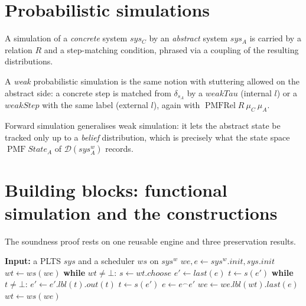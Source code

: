 





\section{Probabilistic simulations}

A simulation of a \emph{concrete} system $sys_C$ by an \emph{abstract} system
$sys_A$ is carried by a relation $R$ and a step-matching condition, phrased via a
coupling of the resulting distributions.





A \emph{weak} probabilistic simulation is the same notion with stuttering
allowed on the abstract side: a concrete step is matched from $\delta_{s_A}$ by
a $weakTau$ (internal $l$) or a $weakStep$ with the same label (external $l$),
again with $\operatorname{PMFRel} R\ \mu_C\ \mu_A$.



Forward simulation generalises weak simulation: it lets the abstract state be
tracked only up to a \emph{belief} distribution, which is precisely what the state
space $\operatorname{PMF} State_A$ of $\mathcal{D}(sys_A^w)$ records.

\section{Building blocks: functional simulation and the constructions}

The soundness proof rests on one reusable engine and three preservation results.







\begin{algorithm}
    \caption{Simulating a scheduler on $sys^w$}
    \label{alg:expand}
    \begin{algorithmic}
        \State \textbf{Input:} a PLTS $sys$ and a scheduler $ws$ on $sys^w$
        \medskip
        \State $we, e \gets sys^w.init, sys.init$
        \State $wt \gets ws(we)$
        \State \textbf{while} $wt \ne \bot$:
        \State\quad $s \gets wt.choose$ 
        \State\quad $e' \gets last(e)$
        \State\quad $t \gets s(e')$
        \State\quad \textbf{while} $t \ne \bot$:
        \State\quad\quad $e' \gets e'.lbl(t).out(t)$
        \State\quad\quad $t \gets s(e')$
        \State\quad $e \gets e^\frown e'$
        \State\quad $we \gets we.lbl(wt).last(e)$
        \State\quad $wt \gets ws(we)$
    \end{algorithmic}
\end{algorithm}

